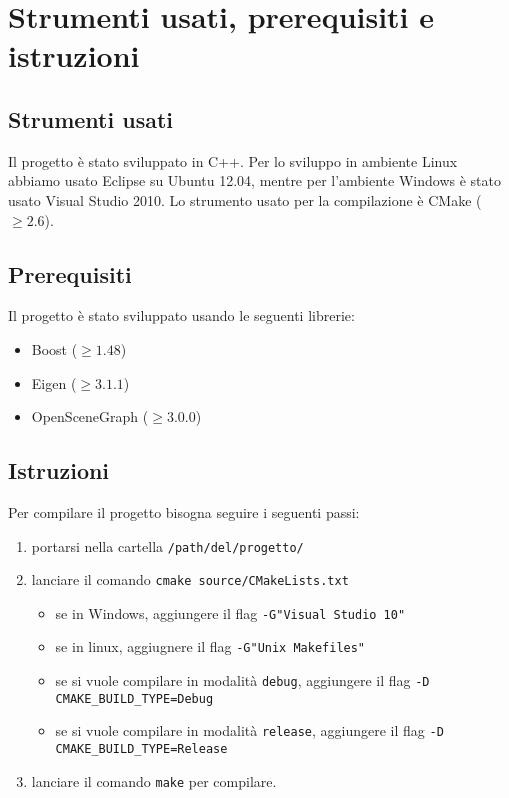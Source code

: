 \section{Strumenti usati, prerequisiti e istruzioni}
\subsection{Strumenti usati}
Il progetto è stato sviluppato in C++. Per lo sviluppo in ambiente Linux abbiamo usato Eclipse su Ubuntu 12.04, mentre per l'ambiente Windows è stato usato Visual Studio 2010. Lo strumento usato per la compilazione è CMake ($\geq 2.6$).

\subsection{Prerequisiti}
Il progetto è stato sviluppato usando le seguenti librerie:
\begin{itemize}[noitemsep]
  \item Boost ($\geq 1.48$)
  \item Eigen ($\geq 3.1.1$)
  \item OpenSceneGraph ($\geq 3.0.0$)
\end{itemize}

\subsection{Istruzioni}
Per compilare il progetto bisogna seguire i seguenti passi:
\begin{enumerate}
  \item portarsi nella cartella \verb!/path/del/progetto/!
  \item lanciare il comando \verb!cmake source/CMakeLists.txt!
    \begin{itemize}[noitemsep]
      \item se in Windows, aggiungere il flag \verb!-G"Visual Studio 10"!
      \item se in linux, aggiugnere il flag \verb!-G"Unix Makefiles"!
    \end{itemize}
    \begin{itemize}[noitemsep]
      \item se si vuole compilare in modalità \verb!debug!, aggiungere il flag \verb!-D CMAKE_BUILD_TYPE=Debug!
      \item se si vuole compilare in modalità \verb!release!, aggiungere il flag \verb!-D CMAKE_BUILD_TYPE=Release!
    \end{itemize}
  \item lanciare il comando \verb!make! per compilare.
\end{enumerate}

